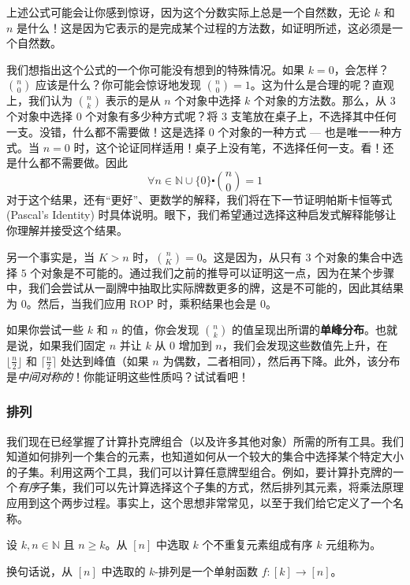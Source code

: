 上述公式可能会让你感到惊讶，因为这个分数实际上总是一个自然数，无论 $k$ 和 $n$ 是什么！这是因为它表示的是完成某个过程的方法数，如证明所述，这必须是一个自然数。

我们想指出这个公式的一个你可能没有想到的特殊情况。如果 $k = 0$，会怎样？${n \choose 0}$ 应该是什么？你可能会惊讶地发现 ${n \choose 0}=1$。这为什么是合理的呢？直观上，我们认为 ${n \choose k}$ 表示的是从 $n$ 个对象中选择 $k$ 个对象的方法数。那么，从 $3$ 个对象中选择 $0$ 个对象有多少种方式呢？将 $3$ 支笔放在桌子上，不选择其中任何一支。没错，什么都不需要做！这是选择 $0$ 个对象的一种方式 --- 也是唯一一种方式。当 $n = 0$ 时，这个论证同样适用！桌子上没有笔，不选择任何一支。看！还是什么都不需要做。因此
\[\forall n \in \mathbb{N} \cup \{0\} \centerdot {n \choose 0}=1\]
对于这个结果，还有``更好''、更数学的解释，我们将在下一节证明帕斯卡恒等式 (Pascal's Identity) 时具体说明。眼下，我们希望通过选择这种启发式解释能够让你理解并接受这个结果。

另一个事实是，当 $K > n$ 时，${n \choose K} = 0$。这是因为，从只有 $3$ 个对象的集合中选择 $5$ 个对象是不可能的。通过我们之前的推导可以证明这一点，因为在某个步骤中，我们会尝试从一副牌中抽取比实际牌数更多的牌，这是不可能的，因此其结果为 $0$。然后，当我们应用 ROP 时，乘积结果也会是 $0$。

如果你尝试一些 $k$ 和 $n$ 的值，你会发现 ${n \choose k}$ 的值呈现出所谓的\textbf{单峰分布}。也就是说，如果我们固定 $n$ 并让 $k$ 从 $0$ 增加到 $n$，我们会发现这些数值先上升，在 $\lfloor\frac{n}{2}\rfloor$ 和 $\lceil\frac{n}{2}\rceil$ 处达到峰值（如果 $n$ 为偶数，二者相同），然后再下降。此外，该分布是\emph{中间对称的}！你能证明这些性质吗？试试看吧！

\subsubsection*{排列}

我们现在已经掌握了计算扑克牌组合（以及许多其他对象）所需的所有工具。我们知道如何排列一个集合的元素，也知道如何从一个较大的集合中选择某个特定大小的子集。利用这两个工具，我们可以计算任意牌型组合。例如，要计算扑克牌的一个\emph{有序}子集，我们可以先计算选择这个子集的方式，然后排列其元素，将乘法原理应用到这个两步过程。事实上，这个思想非常常见，以至于我们给它定义了一个名称。

\begin{definition}
    设 $k, n \in \mathbb{N}$ 且 $n \ge k$。从 $[n]$ 中选取 $k$ 个不重复元素组成有序 $k$ 元组称为。

    换句话说，从 $[n]$ 中选取的 $k$-排列是一个单射函数 $f : [k] \to [n]$。
\end{definition}

